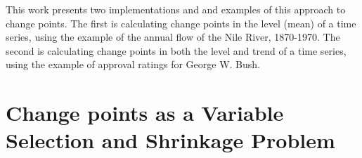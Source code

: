 This work presents two implementations and and examples of this approach to change points.
The first is calculating change points in the level (mean) of a time series, using the example of the annual flow of the Nile River, 1870-1970.
The second is calculating change points in both the level and trend of a time series, using the example of approval ratings for George W. Bush.



\section{Change points as a Variable Selection and Shrinkage Problem}
\label{dlm:sec:chang-as-vari}

